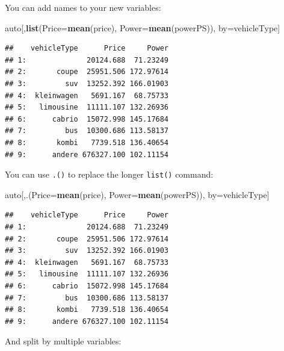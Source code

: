 \documentclass[]{book}
\newenvironment{Shaded}{\begin{snugshade}}{\end{snugshade}}
\newcommand{\DataTypeTok}[1]{\textcolor[rgb]{0.13,0.29,0.53}{#1}}
\newcommand{\KeywordTok}[1]{\textcolor[rgb]{0.13,0.29,0.53}{\textbf{#1}}}
\newcommand{\NormalTok}[1]{#1}
\newcommand{\OperatorTok}[1]{\textcolor[rgb]{0.81,0.36,0.00}{\textbf{#1}}}
\newcommand{\StringTok}[1]{\textcolor[rgb]{0.31,0.60,0.02}{#1}}
\theoremstyle{definition}
\theoremstyle{definition}
\theoremstyle{definition}
\theoremstyle{remark}
\begin{document}
You can add names to your new variables:

\begin{Shaded}
\begin{Highlighting}[]
\NormalTok{auto[,}\KeywordTok{list}\NormalTok{(}\DataTypeTok{Price=}\KeywordTok{mean}\NormalTok{(price), }\DataTypeTok{Power=}\KeywordTok{mean}\NormalTok{(powerPS)), by=vehicleType]}
\end{Highlighting}
\end{Shaded}

\begin{verbatim}
##    vehicleType      Price     Power
## 1:              20124.688  71.23249
## 2:       coupe  25951.506 172.97614
## 3:         suv  13252.392 166.01903
## 4:  kleinwagen   5691.167  68.75733
## 5:   limousine  11111.107 132.26936
## 6:      cabrio  15072.998 145.17684
## 7:         bus  10300.686 113.58137
## 8:       kombi   7739.518 136.40654
## 9:      andere 676327.100 102.11154
\end{verbatim}

You can use \texttt{.()} to replace the longer \texttt{list()} command:

\begin{Shaded}
\begin{Highlighting}[]
\NormalTok{auto[,.(}\DataTypeTok{Price=}\KeywordTok{mean}\NormalTok{(price), }\DataTypeTok{Power=}\KeywordTok{mean}\NormalTok{(powerPS)), by=vehicleType]}
\end{Highlighting}
\end{Shaded}

\begin{verbatim}
##    vehicleType      Price     Power
## 1:              20124.688  71.23249
## 2:       coupe  25951.506 172.97614
## 3:         suv  13252.392 166.01903
## 4:  kleinwagen   5691.167  68.75733
## 5:   limousine  11111.107 132.26936
## 6:      cabrio  15072.998 145.17684
## 7:         bus  10300.686 113.58137
## 8:       kombi   7739.518 136.40654
## 9:      andere 676327.100 102.11154
\end{verbatim}

And split by multiple variables:

\begin{Shaded}
\end{Shaded}
\end{document}
